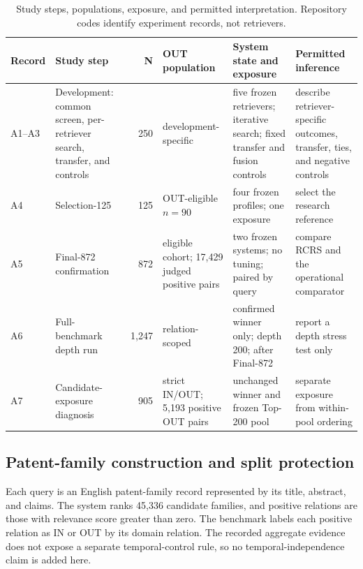 \documentclass[final,5p,times,twocolumn]{elsarticle}
\newenvironment{widejournal}{\begin{table}[!t]}{\end{table}}
\newcommand{\journalTableFont}{\footnotesize}
\newenvironment{widejournal}{\begin{table}[!htbp]}{\end{table}}
\newcommand{\journalTableFont}{\footnotesize}
\begin{document}
\begin{widejournal}
\caption{Study steps, populations, exposure, and permitted interpretation.
Repository codes identify experiment records, not retrievers.}
\label{tab:protocol}
\centering
\journalTableFont
\renewcommand{\arraystretch}{0.98}
\begin{tabularx}{\textwidth}{@{}P{1.1cm}P{2.3cm}r P{2.3cm}P{3.0cm}Y@{}}
\toprule
Record & Study step & N & OUT population & System state and exposure & Permitted inference \\
\midrule
\mbox{A1--A3} & Development: common screen, per-retriever search, transfer, and controls
& 250 & development-specific & five frozen retrievers; iterative search; fixed transfer and
fusion controls & describe retriever-specific outcomes, transfer, ties, and
negative controls \\
A4 & Selection-125 & 125 & OUT-eligible \(n=90\) & four frozen
profiles; one exposure & select the research reference \\
A5 & Final-872 confirmation & 872 & eligible cohort; 17,429 judged positive pairs & two frozen systems; no tuning;
paired by query & compare RCRS and the operational comparator \\
A6 & Full-benchmark depth run & 1,247 & relation-scoped & confirmed winner only; depth
200; after Final-872 & report a depth stress test only \\
A7 & Candidate-exposure diagnosis & 905 & strict IN/OUT; 5,193 positive OUT
pairs & unchanged winner and frozen Top-200 pool & separate exposure
from within-pool ordering \\
\bottomrule
\end{tabularx}
\end{widejournal}

\subsection{Patent-family construction and split protection}

Each query is an English patent-family record represented by its title,
abstract, and claims. The system ranks 45,336 candidate families, and positive
relations are those with relevance score greater than zero. The benchmark
labels each positive relation as IN or OUT by its domain relation. The
recorded aggregate evidence does not expose a separate temporal-control rule,
so no temporal-independence claim is added here.
\end{document}

